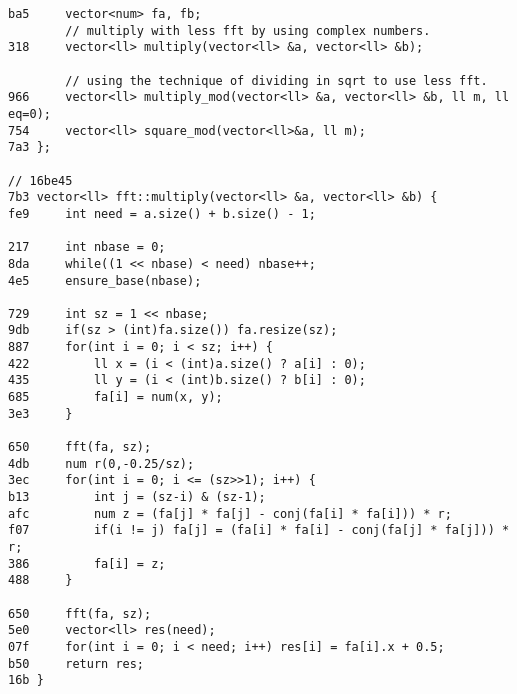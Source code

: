 \documentclass[11pt, a4paper, twoside]{article}
\begin{document}
\begin{lstlisting}
ba5     vector<num> fa, fb;
        // multiply with less fft by using complex numbers.
318     vector<ll> multiply(vector<ll> &a, vector<ll> &b);
     
        // using the technique of dividing in sqrt to use less fft.
966     vector<ll> multiply_mod(vector<ll> &a, vector<ll> &b, ll m, ll eq=0);
754     vector<ll> square_mod(vector<ll>&a, ll m);
7a3 };

// 16be45
7b3 vector<ll> fft::multiply(vector<ll> &a, vector<ll> &b) {
fe9     int need = a.size() + b.size() - 1;
    
217     int nbase = 0;
8da     while((1 << nbase) < need) nbase++;
4e5     ensure_base(nbase);
    
729     int sz = 1 << nbase;
9db     if(sz > (int)fa.size()) fa.resize(sz);
887     for(int i = 0; i < sz; i++) {
422         ll x = (i < (int)a.size() ? a[i] : 0);
435         ll y = (i < (int)b.size() ? b[i] : 0);
685         fa[i] = num(x, y);
3e3     }
    
650     fft(fa, sz);
4db     num r(0,-0.25/sz);
3ec     for(int i = 0; i <= (sz>>1); i++) {
b13         int j = (sz-i) & (sz-1);
afc         num z = (fa[j] * fa[j] - conj(fa[i] * fa[i])) * r;
f07         if(i != j) fa[j] = (fa[i] * fa[i] - conj(fa[j] * fa[j])) * r;
386         fa[i] = z;
488     }
    
650     fft(fa, sz);
5e0     vector<ll> res(need);
07f     for(int i = 0; i < need; i++) res[i] = fa[i].x + 0.5;
b50     return res;
16b }


\end{lstlisting}
\end{document}
